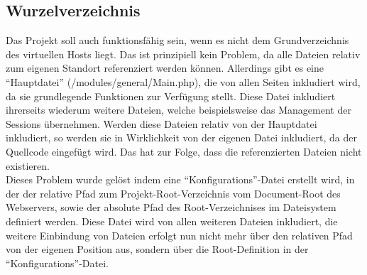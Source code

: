 \subsection{Wurzelverzeichnis}
\label{sec:content_solutions_root}
Das Projekt soll auch funktionsfähig sein, wenn es nicht dem Grundverzeichnis des virtuellen Hosts liegt. Das ist prinzipiell kein Problem, da alle Dateien relativ zum eigenen Standort referenziert werden können. Allerdings gibt es eine \enquote{Hauptdatei} (/modules/general/Main.php), die von allen Seiten inkludiert wird, da sie grundlegende Funktionen zur Verfügung stellt. Diese Datei inkludiert ihrerseits wiederum weitere Dateien, welche beispielsweise das Management der Sessions übernehmen. Werden diese Dateien relativ von der Hauptdatei  inkludiert, so werden sie in Wirklichkeit von der eigenen Datei inkludiert, da der Quellcode eingefügt wird. Das hat zur Folge, dass die referenzierten Dateien nicht existieren.\\
Dieses Problem wurde gelöst indem eine \enquote{Konfigurations}-Datei erstellt wird, in der der relative Pfad zum Projekt-Root-Verzeichnis vom Document-Root des Webservers, sowie der absolute Pfad des Root-Verzeichnises im Dateisystem definiert werden. Diese Datei wird von allen weiteren Dateien inkludiert, die weitere Einbindung von Dateien erfolgt nun nicht mehr über den relativen Pfad von der eigenen Position aus, sondern über die Root-Definition in der \enquote{Konfigurations}-Datei.